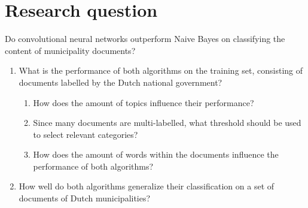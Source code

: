 \documentclass[a4paper]{article}
\begin{document}
\section{Research question}
Do convolutional neural networks outperform Naive Bayes on classifying the content of municipality documents?
\begin{enumerate}
\item What is the performance of both algorithms on the training set, consisting of documents labelled by the Dutch national government?
\begin{enumerate}
\item How does the amount of topics influence their performance?
\item Since many documents are multi-labelled, what threshold should be used to select relevant categories?
\item How does the amount of words within the documents influence the performance of both algorithms?
\end{enumerate}
\item How well do both algorithms generalize their classification on a set of documents of Dutch municipalities?
\end{enumerate}


\end{document}
